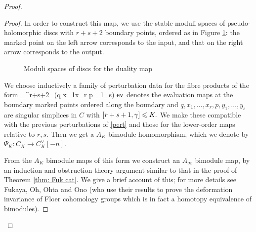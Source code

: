 \documentclass{article}
\theoremstyle{plain}%
\theoremstyle{definition}
\numberwithin{equation}{section}
\numberwithin{figure}{section}
\def\e#1\e{\begin{equation}#1\end{equation}}
\def\eq{\eqref}
\def\le{\leqslant\nobreak}
\def\cM{{\mathbin{\cal M}}}
\def\ga{\gamma}
\def\Ps{\Psi}
\def\iy{\infty}
\def\t{\times}
\begin{document}
\begin{proof}
\begin{proof}
In order to construct this map, we use the stable moduli spaces of pseudo-holomorphic discs with $r+s+2$ boundary points, ordered as in Figure \ref{fig:duality}: the marked point on the left arrow corresponds to the input, and that on the right arrow corresponds to the output.
      \begin{figure}[h]
        \centering
        \caption{Moduli spaces of discs for the duality map}
        \label{fig:duality}
      \end{figure}
      We choose inductively a family of perturbation data for the fibre products of the form
      \e\cM_\ga^{r+s+2}\t_\ev(q \t x_1\t\cdots \t x_r \t p \t \tau_1\t \cdots \t \tau_s)\e
      where ${\rm ev}$ denotes the evaluation maps at the boundary marked points ordered along the boundary and $q,x_1,\dots,x_r,p,y_1,\dots,y_s$ are singular simplices in $C$ with $[r+s+1,\ga]\le K.$
We make these compatible with the previous perturbations of \eq{pert} and those for the lower-order maps relative to $r,s.$ Then we get a $A_K$ bimodule homomorphism, which we denote by $\Ps_K: C_K \to C^{\vee}_{K}[-n].$

From the $A_K$ bimodule maps of this form we construct an $A_\iy$ bimodule map, by an induction and obstruction theory argument similar to that in the proof of Theorem \ref{thm: Fuk cat}. We give a brief account of this; for more details see Fukaya, Oh, Ohta and Ono \cite[\S5.2]{FOOO} (who use their results to prove the deformation invariance of Floer cohomology groups \cite[Theorem D]{FOOO} which is in fact a homotopy equivalence of bimodules).


\end{proof}
\end{proof}
\end{document}
